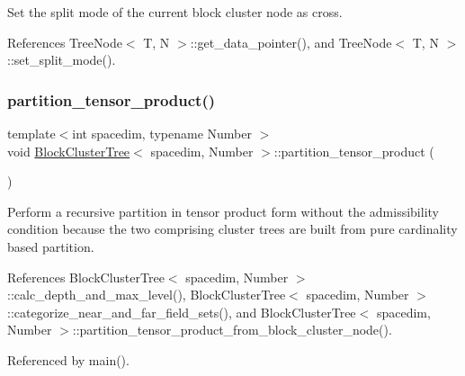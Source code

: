 Set the split mode of the current block cluster node as cross.

References Tree\+Node$<$ T, N $>$\+::get\+\_\+data\+\_\+pointer(), and Tree\+Node$<$ T, N $>$\+::set\+\_\+split\+\_\+mode().

\mbox{\label{classBlockClusterTree_ab10f54639969bc4aacd6aa27cf315610}} 
\subsubsection{\texorpdfstring{partition\+\_\+tensor\+\_\+product()}{partition\_tensor\_product()}}
{\footnotesize\ttfamily template$<$int spacedim, typename Number $>$ \\
void \hyperlink{classBlockClusterTree}{Block\+Cluster\+Tree}$<$ spacedim, Number $>$\+::partition\+\_\+tensor\+\_\+product (\begin{DoxyParamCaption}{ }\end{DoxyParamCaption})}

Perform a recursive partition in tensor product form without the admissibility condition because the two comprising cluster trees are built from pure cardinality based partition. 

References Block\+Cluster\+Tree$<$ spacedim, Number $>$\+::calc\+\_\+depth\+\_\+and\+\_\+max\+\_\+level(), Block\+Cluster\+Tree$<$ spacedim, Number $>$\+::categorize\+\_\+near\+\_\+and\+\_\+far\+\_\+field\+\_\+sets(), and Block\+Cluster\+Tree$<$ spacedim, Number $>$\+::partition\+\_\+tensor\+\_\+product\+\_\+from\+\_\+block\+\_\+cluster\+\_\+node().



Referenced by main().

\mbox{\label{classBlockClusterTree_ae77f8167ce49871f5751b8dcf8c93153}} 
